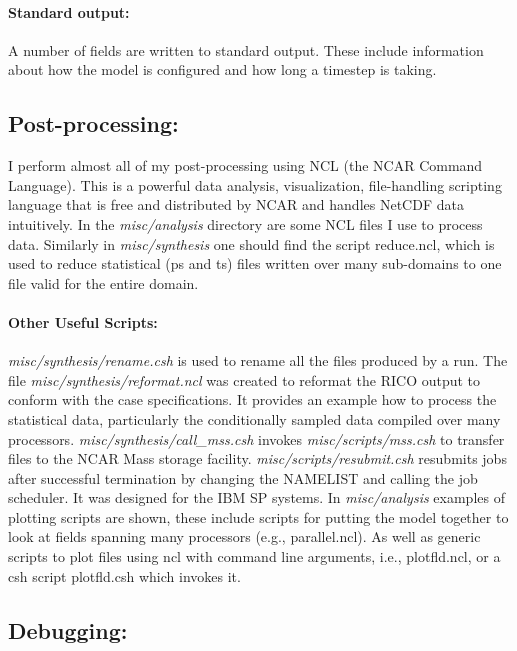 \documentclass[11pt,a4paper]{article}
\begin{document}
\paragraph{Standard output:}  A number of fields are written to
standard output.  These include information about how the model is
configured and how long a timestep is taking.

\subsection{Post-processing:}

I perform almost all of my post-processing using NCL (the NCAR Command
Language).  This is a powerful data analysis, visualization,
file-handling scripting language that is free and distributed by NCAR
and handles NetCDF data intuitively.  In the \emph{misc/analysis}
directory are some NCL files I use to process data.  Similarly in
\emph{misc/synthesis} one should find the script reduce.ncl, which is
used to reduce statistical (ps and ts) files written over many
sub-domains to one file valid for the entire domain.

\paragraph{Other Useful Scripts:} \emph{misc/synthesis/rename.csh} 
is used to rename all the files produced by a run.  The file
\emph{misc/synthesis/reformat.ncl} was created to reformat the RICO
output to conform with the case specifications.  It provides an
example how to process the statistical data, particularly the
conditionally sampled data compiled over many
processors. \emph{misc/synthesis/call\_mss.csh} invokes
\emph{misc/scripts/mss.csh} to transfer files to the NCAR Mass storage
facility.  \emph{misc/scripts/resubmit.csh} resubmits jobs after
successful termination by changing the NAMELIST and calling the job
scheduler.  It was designed for the IBM SP systems.  In
\emph{misc/analysis} examples of plotting scripts are shown, these
include scripts for putting the model together to look at fields
spanning many processors (e.g., parallel.ncl).  As well as generic
scripts to plot files using ncl with command line arguments, i.e.,
plotfld.ncl, or a csh script plotfld.csh which invokes it.

\subsection{Debugging:}
\end{document}
